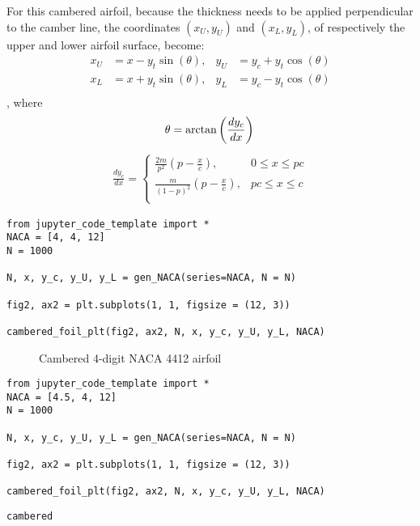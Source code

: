 \documentclass[11pt]{article}
\begin{document}
For this cambered airfoil, because the thickness needs to be applied
perpendicular to the camber line, the coordinates \((x_U,y_U)\) and
\((x_L,y_L)\), of respectively the upper and lower airfoil surface,
become: \begin{align}
    x_U &= x-y_t \sin(\theta), & y_U &= y_c +y_t\cos(\theta)\\
    x_L &= x+y_t \sin(\theta), & y_L &= y_c -y_t\cos(\theta)\\
\end{align}, where \begin{equation}
    \theta = \arctan\left(\frac{dy_c}{dx}\right)\\
\end{equation} \begin{equation}
    \begin{aligned}
        \frac{dy_c}{dx} =
        \begin{cases}
            \frac{2m}{p^2} \left( p-\frac{x}{c}\right), & 0\leq x \leq pc\\
            \frac{m}{(1-p)^2}\left( p-\frac{x}{c}\right), & pc \leq x \leq c\\
        \end{cases}
    \end{aligned}
\end{equation}
%
\begin{lstlisting}
from jupyter_code_template import *
NACA = [4, 4, 12]
N = 1000

N, x, y_c, y_U, y_L = gen_NACA(series=NACA, N = N)

fig2, ax2 = plt.subplots(1, 1, figsize = (12, 3))

cambered_foil_plt(fig2, ax2, N, x, y_c, y_U, y_L, NACA)
\end{lstlisting}%
    
    

    
    
    
    
\begin{figure}
    \begin{center}
    \end{center}
    \caption{Cambered 4-digit NACA 4412 airfoil}      
    \label{fig:series4cam}
\end{figure}
\begin{lstlisting}
from jupyter_code_template import *
NACA = [4.5, 4, 12]
N = 1000

N, x, y_c, y_U, y_L = gen_NACA(series=NACA, N = N)

fig2, ax2 = plt.subplots(1, 1, figsize = (12, 3))

cambered_foil_plt(fig2, ax2, N, x, y_c, y_U, y_L, NACA)
\end{lstlisting}%
    \begin{Verbatim}[commandchars=\\\{\}]
cambered

    \end{Verbatim}
\end{document}
